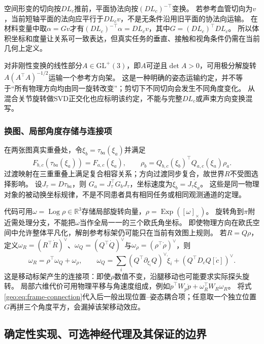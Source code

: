 \documentclass[11pt,a4paper]{article}
\numberwithin{equation}{section}
\theoremstyle{definition}
\newcommand{\R}{\mathbb R}
\begin{document}
空间形变的切向按$D L_c$推前，平面协法向按$(D L_c)^{-\top}$变换。
若参考血管切向为$v$，当前短轴平面的法向应平行于$D L_cv$，不是无条件沿用旧平面的协法向运输。
在材料变量中取$\alpha=Gv$才有$(D L_c)^{-\top}\alpha=D L_cv$，其中$G=(D L_c)^{\top}D L_c$。
所以体积坐标和度量让关系可一致表达，但真实任务的垂直、接触和视角条件仍需在当前几何上定义。

对非刚性变换的线性部分$A\in\mathrm{GL}^{+}(3)$，即$A$可逆且$\det A>0$，可用极分解旋转$A(A^{\top}A)^{-1/2}$运输一个参考方向架。
这是一种明确的姿态运输约定，并不等于“所有物理方向均由同一旋转改变”；剪切下不同切向会发生不同角度变化。
从混合关节旋转做SVD正交化也应标明该约定，不能与完整$D L_c$或声束方向变换混写。

\subsubsection{换图、局部角度存储与连接项}
在两张图真实重叠处，令$\xi_b=\tau_{ba}(\xi_a)$并满足
\begin{equation}
 F_{b,c}(\tau_{ba}(\xi_a))=F_{a,c}(\xi_a),\qquad
 \rho_b=Q_{b,c}(\xi_b)^{\top}Q_{a,c}(\xi_a)\rho_a.
 \label{geo:eq:pose-transition}
\end{equation}
过渡映射在三重重叠上满足复合相容关系；方向过渡同步复合，故世界$R$不受图选择影响。
设$J_\tau=D\tau_{ba}$，则
$G_a=J_\tau^{\top}G_bJ_\tau$，坐标速度为$\dot\xi_b=J_\tau\dot\xi_a$。
这些是同一物理对象的被动换坐标规律，不是不同患者具有相同任务或相同观测通道的定理。

代码可用$\omega=\operatorname{Log}\rho\in\R^3$存储局部旋转向量，$\rho=\operatorname{Exp}([\omega]_\times)$。
旋转角到$\pi$附近需处理分支，不能把$\omega$当作全局一一的三个欧氏角坐标。
即使物理方向在欧氏空间中允许整体平凡化，解剖参考标架仍可能只在当前有效图上规则。
若$R=Q\rho$，定义$\omega_R=(R^{\top}\dot R)^\vee$、$\omega_Q=(Q^{\top}\dot Q)^\vee$与$\omega_\rho=(\rho^{\top}\dot\rho)^\vee$，则
\begin{equation}
 \omega_R=\rho^{\top}\omega_Q+\omega_\rho,
 \qquad
 \omega_Q=\sum_i (Q^{\top}\partial_{\xi_i}Q)^\vee\dot\xi_i
              +(Q^{\top}D_cQ[\dot c])^\vee.
 \label{geo:eq:frame-connection}
\end{equation}
这是移动标架产生的连接项：即使$\rho$数值不变，沿腿移动也可能要求实际探头旋转。
局部六维代价可用物理平移与角速度组成，例如$\dot p^{\top}W_p\dot p+\omega_R^{\top}W_R\omega_R$。
将式\eqref{geo:eq:frame-connection}代入后一般出现位置--姿态耦合项；任意取一个独立位置$G$再拼三个角度平方，会漏掉该架移动效应。

\subsection{确定性实现、可选神经代理及其保证的边界}
\label{geo:sub:actual-implementation}
\end{document}

